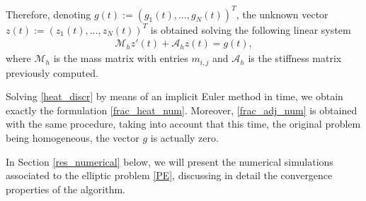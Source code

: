 Therefore, denoting $g(t):=\left(g_1(t),\ldots,g_N(t)\right)^T$, the unknown vector $z(t):=\left(z_1(t),\ldots,z_N(t)\right)^T$ is obtained solving the following linear system
\begin{align}\label{heat_discr}
	\mathcal M_hz'(t) + \mathcal A_h z(t) = g(t),
\end{align} 
where $\mathcal M_h$ is the mass matrix with entries $m_{i,j}$ and $\mathcal A_h$ is the stiffness matrix previously computed.

Solving \eqref{heat_discr} by means of an implicit Euler method in time, we obtain exactly the formulation \eqref{frac_heat_num}. Moreover, \eqref{frac_adj_num} is obtained with the same procedure, taking into account that this time, the original problem being homogeneous, the vector $g$ is actually zero.


In Section \ref{res_numerical} below, we will present the numerical simulations associated to  the elliptic problem \eqref{PE}, discussing in detail the convergence properties of the algorithm. 



